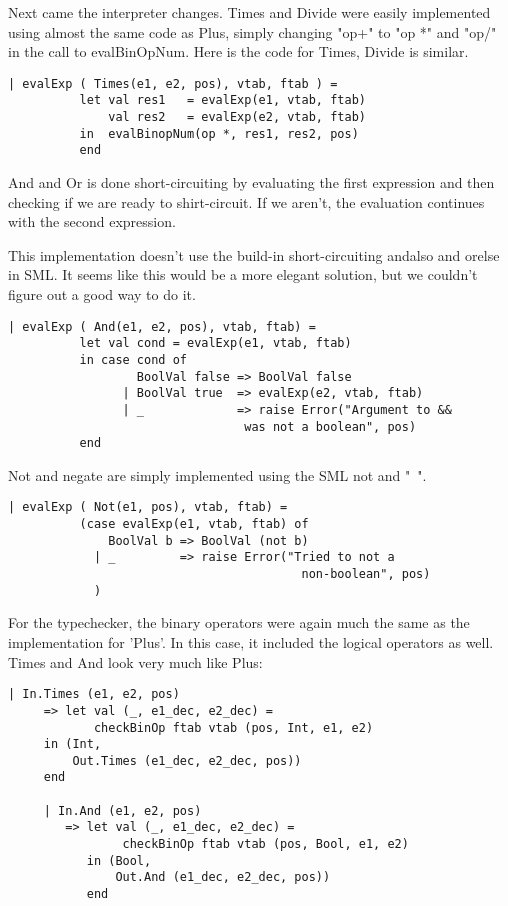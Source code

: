 \documentclass[10pt]{article}
\begin{document}
Next came the interpreter changes. Times and Divide were easily implemented using almost the same code as Plus, simply changing "op+" to "op *" and "op/" in the call to evalBinOpNum. Here is the code for Times, Divide is similar.

\begin{Verbatim}[frame=single]
    | evalExp ( Times(e1, e2, pos), vtab, ftab ) =
          let val res1   = evalExp(e1, vtab, ftab)
              val res2   = evalExp(e2, vtab, ftab)
          in  evalBinopNum(op *, res1, res2, pos)
          end
\end{Verbatim}

And and Or is done short-circuiting by evaluating the first expression and then checking if we are ready to shirt-circuit. If we aren't, the evaluation continues with the second expression.

This implementation doesn't use the build-in short-circuiting andalso and orelse in SML. It seems like this would be a more elegant solution, but we couldn't figure out a good way to do it.

\begin{Verbatim}[frame=single]
    | evalExp ( And(e1, e2, pos), vtab, ftab) =
          let val cond = evalExp(e1, vtab, ftab)
          in case cond of
                  BoolVal false => BoolVal false
                | BoolVal true  => evalExp(e2, vtab, ftab)
                | _             => raise Error("Argument to && 
                                 was not a boolean", pos)
          end
\end{Verbatim}

Not and negate are simply implemented using the SML not and "~".

\begin{Verbatim}[frame=single]
    | evalExp ( Not(e1, pos), vtab, ftab) =
          (case evalExp(e1, vtab, ftab) of
              BoolVal b => BoolVal (not b)
            | _         => raise Error("Tried to not a
            							 non-boolean", pos)
            )
\end{Verbatim}

For the typechecker, the binary operators were again much the same as the implementation for 'Plus'. In this case, it included the logical operators as well. Times and And look very much like Plus:

\begin{Verbatim}[frame=single]
   | In.Times (e1, e2, pos)
     => let val (_, e1_dec, e2_dec) = 
     		checkBinOp ftab vtab (pos, Int, e1, e2)
     in (Int,
         Out.Times (e1_dec, e2_dec, pos))
     end

     | In.And (e1, e2, pos)
        => let val (_, e1_dec, e2_dec) = 
        		checkBinOp ftab vtab (pos, Bool, e1, e2) 
           in (Bool,
               Out.And (e1_dec, e2_dec, pos))
           end
\end{Verbatim}
\end{document}
